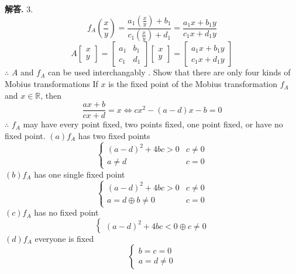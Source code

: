 \documentclass[12pt, a4paper, oneside]{article}
\newenvironment{solution}{\par\noindent\textbf{解答. }}{\par}
\begin{document}
\begin{CJK}{UTF8}{gbsn}
\begin{solution}
 3. \newline
 $$ f_A\left(\frac{x}{y}\right) = \frac{a_1\left(\frac{x}{y}\right) + b_1}{c_1\left(\frac{x}{y}\right) + d_1}  = \frac{a_1x + b_1y}{c_1x+d_1y}$$
 $$ A \begin{bmatrix}
   x \\ y 
 \end{bmatrix} = \begin{bmatrix}
   a_1 & b_1 \\ c_1 & d_1
 \end{bmatrix} \begin{bmatrix}
   x \\ y
 \end{bmatrix} = \begin{bmatrix}
   a_1x + b_1y \\ c_1x + d_1y
 \end{bmatrix}$$
 $\therefore$ $A$ and $f_A$ can be used interchangably . Show that there are only four kinds of Mobius transformations \newline
 If $x$ is the fixed point of the Mobius transformation $f_A$ and $x\in \mathbb{R}$, then  
 $$ \frac{ax+b}{cx+d} = x \Leftrightarrow cx^2 - (a-d)x - b = 0$$
 $\therefore$ $f_A$ may have every point fixed, two points fixed, one point fixed, or have no fixed point. \newline 
 $(a) f_A$ has two fixed points 
 $$ \begin{cases}
  (a-d)^2 + 4bc > 0 & c\neq 0 \\
 a \neq d & c = 0
\end{cases} $$
 $(b) f_A$ has one single fixed point 
 $$ \begin{cases}
   (a-d)^2 + 4bc > 0 & c \neq 0 \\
   a = d \oplus b\neq 0& c=0
 \end{cases}$$
 $(c) f_A$ has no fixed point  
 $$ \begin{cases}
   (a-d)^2 + 4bc < 0 \oplus c \neq 0
 \end{cases}$$
 $(d) f_A$ everyone is fixed 
 $$ \begin{cases}
  b = c = 0 \\
  a = d \neq 0 
\end{cases} $$

\end{solution} 



\end{CJK}
\end{document}
